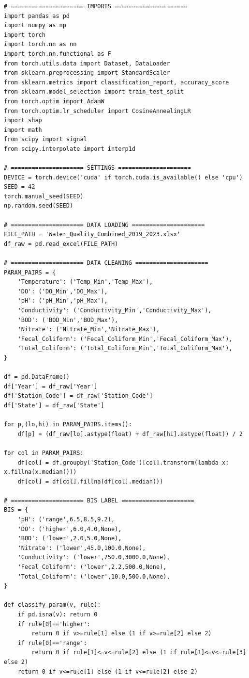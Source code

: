 \documentclass[12pt,a4paper]{report}
\numberwithin{table}{chapter}
\numberwithin{figure}{chapter}
\begin{document}
\begin{verbatim}
# ===================== IMPORTS =====================
import pandas as pd
import numpy as np
import torch
import torch.nn as nn
import torch.nn.functional as F
from torch.utils.data import Dataset, DataLoader
from sklearn.preprocessing import StandardScaler
from sklearn.metrics import classification_report, accuracy_score
from sklearn.model_selection import train_test_split
from torch.optim import AdamW
from torch.optim.lr_scheduler import CosineAnnealingLR
import shap
import math
from scipy import signal
from scipy.interpolate import interp1d

# ===================== SETTINGS =====================
DEVICE = torch.device('cuda' if torch.cuda.is_available() else 'cpu')
SEED = 42
torch.manual_seed(SEED)
np.random.seed(SEED)

# ===================== DATA LOADING =====================
FILE_PATH = 'Water_Quality_Combined_2019_2023.xlsx'
df_raw = pd.read_excel(FILE_PATH)

# ===================== DATA CLEANING =====================
PARAM_PAIRS = {
    'Temperature': ('Temp_Min','Temp_Max'),
    'DO': ('DO_Min','DO_Max'),
    'pH': ('pH_Min','pH_Max'),
    'Conductivity': ('Conductivity_Min','Conductivity_Max'),
    'BOD': ('BOD_Min','BOD_Max'),
    'Nitrate': ('Nitrate_Min','Nitrate_Max'),
    'Fecal_Coliform': ('Fecal_Coliform_Min','Fecal_Coliform_Max'),
    'Total_Coliform': ('Total_Coliform_Min','Total_Coliform_Max'),
}

df = pd.DataFrame()
df['Year'] = df_raw['Year']
df['Station_Code'] = df_raw['Station_Code']
df['State'] = df_raw['State']

for p,(lo,hi) in PARAM_PAIRS.items():
    df[p] = (df_raw[lo].astype(float) + df_raw[hi].astype(float)) / 2

for col in PARAM_PAIRS:
    df[col] = df.groupby('Station_Code')[col].transform(lambda x: x.fillna(x.median()))
    df[col] = df[col].fillna(df[col].median())

# ===================== BIS LABEL =====================
BIS = {
    'pH': ('range',6.5,8.5,9.2),
    'DO': ('higher',6.0,4.0,None),
    'BOD': ('lower',2.0,5.0,None),
    'Nitrate': ('lower',45.0,100.0,None),
    'Conductivity': ('lower',750.0,3000.0,None),
    'Fecal_Coliform': ('lower',2.2,500.0,None),
    'Total_Coliform': ('lower',10.0,500.0,None),
}

def classify_param(v, rule):
    if pd.isna(v): return 0
    if rule[0]=='higher':
        return 0 if v>=rule[1] else (1 if v>=rule[2] else 2)
    if rule[0]=='range':
        return 0 if rule[1]<=v<=rule[2] else (1 if rule[1]<=v<=rule[3] else 2)
    return 0 if v<=rule[1] else (1 if v<=rule[2] else 2)


\end{verbatim}
\end{document}
